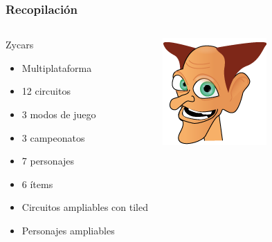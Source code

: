 \begin{frame}
    \frametitle{Recopilación}

    \begin{columns}
    
        \column{200px}
        \begin{block}{Zycars}
            \begin{itemize}
                \item Multiplataforma
                \item 12 circuitos
                \item 3 modos de juego
                \item 3 campeonatos
                \item 7 personajes
                \item 6 ítems
                \item Circuitos ampliables con tiled
                \item Personajes ampliables
            \end{itemize}
        \end{block}

        \column{100px}
        \begin{center}
                \includegraphics[scale=0.5]{imagenes/character2.png}
        \end{center}
    
    \end{columns}
        
\end{frame}
